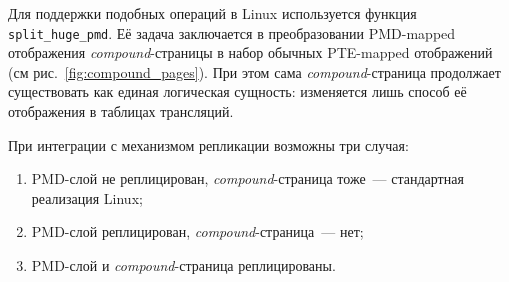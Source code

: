 Для поддержки подобных операций в Linux используется функция \texttt{split\_huge\_pmd}. Её задача заключается в преобразовании PMD-mapped отображения \textit{compound}-страницы в набор обычных PTE-mapped отображений (см рис.~\ref{fig:compound_pages}). При этом сама \textit{compound}-страница продолжает существовать как единая логическая сущность: изменяется лишь способ её отображения в таблицах трансляций.

При интеграции с механизмом репликации возможны три случая:
\begin{enumerate}
    \item PMD-слой не реплицирован, \textit{compound}-страница тоже~--- стандартная реализация Linux;
    \item PMD-слой реплицирован, \textit{compound}-страница~--- нет;
    \item\label{itm:split_huge_pmd} PMD-слой и \textit{compound}-страница реплицированы.
\end{enumerate}

